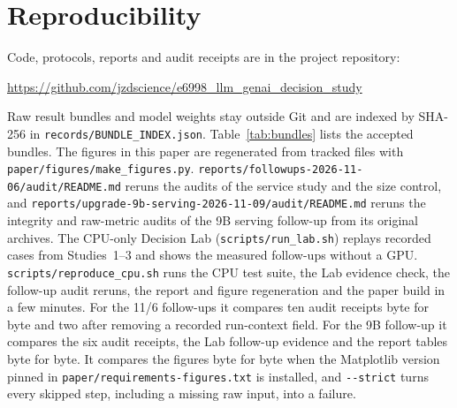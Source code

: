 \documentclass[11pt]{article}
\begin{document}
\begin{table}[h]
\centering
\small
\setlength{\tabcolsep}{2.5pt}
\caption{Probability quality on Study~1 test sets, released $\to$ refitted temperature (lower is better).}
\label{tab:prob}
\end{table}

\section{Reproducibility}

Code, protocols, reports and audit receipts are in the project repository:
\begin{center}\small\url{https://github.com/jzdscience/e6998_llm_genai_decision_study}\end{center}
Raw result bundles and model weights stay outside Git and are indexed by SHA-256 in \nolinkurl{records/BUNDLE_INDEX.json}. Table~\ref{tab:bundles} lists the accepted bundles. The figures in this paper are regenerated from tracked files with \nolinkurl{paper/figures/make_figures.py}. \nolinkurl{reports/followups-2026-11-06/audit/README.md} reruns the audits of the service study and the size control, and \nolinkurl{reports/upgrade-9b-serving-2026-11-09/audit/README.md} reruns the integrity and raw-metric audits of the 9B serving follow-up from its original archives. The CPU-only Decision Lab (\nolinkurl{scripts/run_lab.sh}) replays recorded cases from Studies~1--3 and shows the measured follow-ups without a GPU. \nolinkurl{scripts/reproduce_cpu.sh} runs the CPU test suite, the Lab evidence check, the follow-up audit reruns, the report and figure regeneration and the paper build in a few minutes. For the 11/6 follow-ups it compares ten audit receipts byte for byte and two after removing a recorded run-context field. For the 9B follow-up it compares the six audit receipts, the Lab follow-up evidence and the report tables byte for byte. It compares the figures byte for byte when the Matplotlib version pinned in \nolinkurl{paper/requirements-figures.txt} is installed, and \texttt{-{}-strict} turns every skipped step, including a missing raw input, into a failure.
\end{document}
